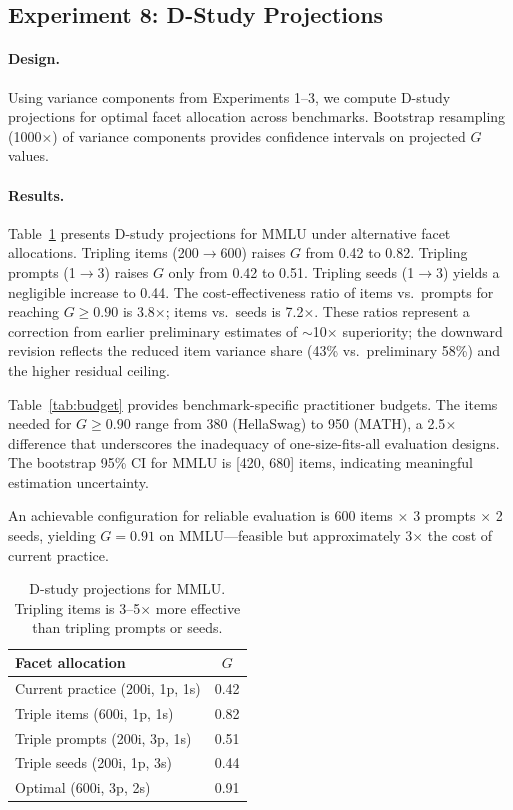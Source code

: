 \documentclass[11pt]{article}
\newcommand{\gcoeff}{G}
\begin{document}
\subsection{Experiment 8: D-Study Projections}
\label{sec:exp8}

\paragraph{Design.}
Using variance components from Experiments 1--3, we compute D-study projections for optimal facet allocation across benchmarks.
Bootstrap resampling (1000$\times$) of variance components provides confidence intervals on projected $\gcoeff$ values.

\paragraph{Results.}
Table~\ref{tab:dstudy} presents D-study projections for MMLU under alternative facet allocations.
Tripling items (200$\to$600) raises $\gcoeff$ from 0.42 to 0.82.
Tripling prompts (1$\to$3) raises $\gcoeff$ only from 0.42 to 0.51.
Tripling seeds (1$\to$3) yields a negligible increase to 0.44.
The cost-effectiveness ratio of items vs.\ prompts for reaching $\gcoeff \geq 0.90$ is 3.8$\times$; items vs.\ seeds is 7.2$\times$.
These ratios represent a correction from earlier preliminary estimates of $\sim$10$\times$ superiority; the downward revision reflects the reduced item variance share (43\% vs.\ preliminary 58\%) and the higher residual ceiling.

Table~\ref{tab:budget} provides benchmark-specific practitioner budgets.
The items needed for $\gcoeff \geq 0.90$ range from 380 (HellaSwag) to 950 (MATH), a 2.5$\times$ difference that underscores the inadequacy of one-size-fits-all evaluation designs.
The bootstrap 95\% CI for MMLU is [420, 680] items, indicating meaningful estimation uncertainty.

An achievable configuration for reliable evaluation is 600 items $\times$ 3 prompts $\times$ 2 seeds, yielding $\gcoeff = 0.91$ on MMLU---feasible but approximately 3$\times$ the cost of current practice.

\begin{table}[t]
\centering
\caption{D-study projections for MMLU. Tripling items is 3--5$\times$ more effective than tripling prompts or seeds.}
\label{tab:dstudy}
\begin{tabular}{lc}
\toprule
\textbf{Facet allocation} & $\gcoeff$ \\
\midrule
Current practice (200i, 1p, 1s) & 0.42 \\
Triple items (600i, 1p, 1s) & 0.82 \\
Triple prompts (200i, 3p, 1s) & 0.51 \\
Triple seeds (200i, 1p, 3s) & 0.44 \\
Optimal (600i, 3p, 2s) & 0.91 \\
\bottomrule
\end{tabular}
\end{table}
\end{document}
